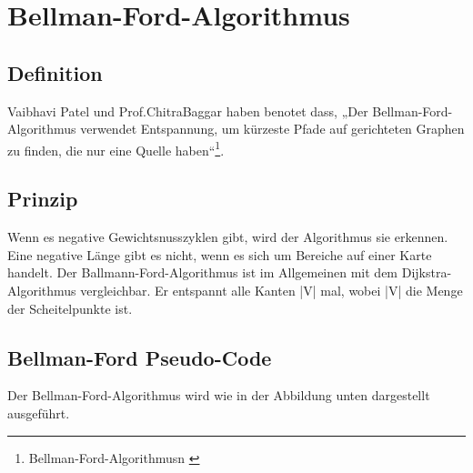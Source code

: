 \section{Bellman-Ford-Algorithmus}

\subsection{Definition}

Vaibhavi Patel und Prof.ChitraBaggar haben benotet dass, „Der Bellman-Ford-Algorithmus verwendet Entspannung, um kürzeste Pfade auf gerichteten Graphen zu finden, die nur eine Quelle haben“\footnote{Bellman-Ford-Algorithmusn \cite{Research-id10}}.
\subsection{Prinzip}
Wenn es negative Gewichtsnusszyklen gibt, wird der Algorithmus sie erkennen. Eine negative Länge gibt es nicht, wenn es sich um Bereiche auf einer Karte handelt. Der Ballmann-Ford-Algorithmus ist im Allgemeinen mit dem Dijkstra-Algorithmus vergleichbar. Er entspannt alle Kanten |V| mal, wobei |V| die Menge der Scheitelpunkte ist\cite{Research-id10}.

\subsection{Bellman-Ford Pseudo-Code}
Der Bellman-Ford-Algorithmus wird wie in der Abbildung unten dargestellt ausgeführt.


